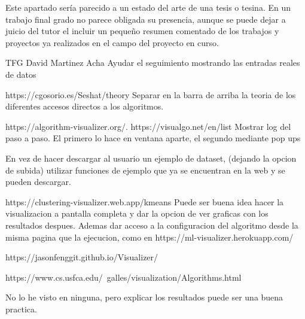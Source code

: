 
Este apartado sería parecido a un estado del arte de una tesis o tesina. En un trabajo final grado no parece obligada su presencia, aunque se puede dejar a juicio del tutor el incluir un pequeño resumen comentado de los trabajos y proyectos ya realizados en el campo del proyecto en curso. 


TFG David Martinez Acha
Ayudar el seguimiento mostrando las entradas reales de datos

https://cgosorio.es/Seshat/theory
Separar en la barra de arriba la teoria de los diferentes accesos directos a los algoritmos.

https://algorithm-visualizer.org/.
https://visualgo.net/en/list
Mostrar log del paso a paso. El primero lo hace en ventana aparte, el segundo mediante pop ups 

En vez de hacer descargar al usuario un ejemplo de dataset, (dejando la opcion de subida) utilizar funciones de ejemplo que ya se encuentran en la web y se pueden descargar.


https://clustering-visualizer.web.app/kmeans
Puede ser buena idea hacer la visualizacion a pantalla completa y dar la opcion de ver graficas con los resultados despues. Ademas dar acceso a la configuracion del algoritmo desde la misma pagina que la ejecucion, como en https://ml-visualizer.herokuapp.com/


https://jasonfenggit.github.io/Visualizer/

https://www.cs.usfca.edu/~galles/visualization/Algorithms.html


No lo he visto en ninguna, pero explicar los resultados puede ser una buena practica.